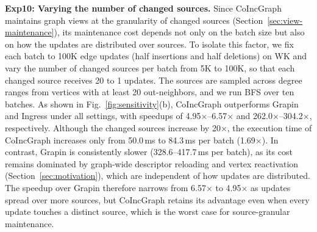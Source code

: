 \textbf{Exp10: Varying the number of changed sources.} Since CoIncGraph maintains graph views at the granularity of changed sources (Section~\ref{sec:view-maintenance}), its maintenance cost depends not only on the batch size but also on how the updates are distributed over sources. To isolate this factor, we fix each batch to 100K edge updates (half insertions and half deletions) on WK and vary the number of changed sources per batch from 5K to 100K, so that each changed source receives 20 to 1 updates. The sources are sampled across degree ranges from vertices with at least 20 out-neighbors, and we run BFS over ten batches. As shown in Fig.~\ref{fig:sensitivity}(b), CoIncGraph outperforms Grapin and Ingress under all settings, with speedups of 4.95$\times$--6.57$\times$ and 262.0$\times$--304.2$\times$, respectively. Although the changed sources increase by 20$\times$, the execution time of CoIncGraph increases only from 50.0\,ms to 84.3\,ms per batch (1.69$\times$). In contrast, Grapin is consistently slower (328.6--417.7\,ms per batch), as its cost remains dominated by graph-wide descriptor reloading and vertex reactivation (Section~\ref{sec:motivation}), which are independent of how updates are distributed. The speedup over Grapin therefore narrows from 6.57$\times$ to 4.95$\times$ as updates spread over more sources, but CoIncGraph retains its advantage even when every update touches a distinct source, which is the worst case for source-granular maintenance.